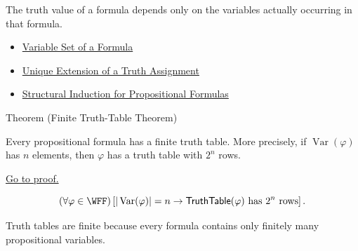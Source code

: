 \begin{remark*}[Interpretation]
The truth value of a formula depends only on the variables actually occurring in that formula.
\end{remark*}

\begin{dependencies}
\begin{itemize}
  \item \hyperref[def:formula-variable-set-propositional-logic]{Variable Set of a Formula}
  \item \hyperref[thm:unique-extension-truth-assignment-propositional-logic]{Unique Extension of a Truth Assignment}
  \item \hyperref[thm:structural-induction-propositional-formulas]{Structural Induction for Propositional Formulas}
\end{itemize}
\end{dependencies}
\begin{theorembox}{Theorem (Finite Truth-Table Theorem)}
\begin{theorem}
\label{thm:finite-truth-table-propositional-logic}
Every propositional formula has a finite truth table. More precisely, if \(\operatorname{Var}(\varphi)\) has \(n\) elements, then \(\varphi\) has a truth table with \(2^n\) rows.

\noindent\hyperref[prf:finite-truth-table-propositional-logic]{Go to proof.}
\end{theorem}
\end{theorembox}

\begin{remark*}
\[
(\forall\varphi\in\WFF)
\left[
|\operatorname{Var}(\varphi)|=n
\to
\mathsf{TruthTable}(\varphi)\text{ has }2^n\text{ rows}
\right].
\]
\end{remark*}

\begin{remark*}[Interpretation]
Truth tables are finite because every formula contains only finitely many propositional variables.
\end{remark*}

